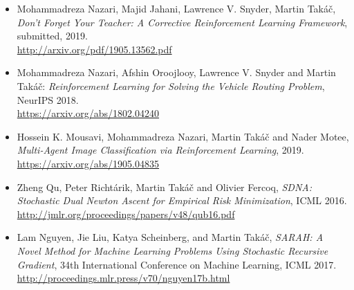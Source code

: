 \documentclass[11pt]{article}
\newcommand{\0}{ {\bf 0}}
\begin{document}
\begin{itemize}
\setlength\itemsep{0.1em}



\item 
Mohammadreza Nazari, Majid Jahani, Lawrence V. Snyder, Martin Tak\'a\v{c},
{\it Don't Forget Your Teacher: A Corrective Reinforcement Learning Framework}, submitted,
 2019. 
\\
\url{http://arxiv.org/pdf/1905.13562.pdf}

 
 

\item 
Mohammadreza Nazari, Afshin Oroojlooy, Lawrence V. Snyder and Martin Tak\'a\v{c}:
{\it Reinforcement Learning for Solving the Vehicle Routing Problem},
NeurIPS 2018.
\\
\url{https://arxiv.org/abs/1802.04240}





\item 
Hossein K. Mousavi, Mohammadreza Nazari, Martin Tak\'a\v{c} and Nader Motee,
{\it Multi-Agent Image Classification via Reinforcement Learning}, 2019. 
\\
\url{https://arxiv.org/abs/1905.04835}

 

 
 

 
 




\item Zheng Qu, Peter Richt\'arik, Martin Tak\'a\v{c}
and  Olivier Fercoq,
{\it SDNA: Stochastic Dual Newton Ascent for Empirical Risk Minimization},
    ICML 2016.
\\
\url{http://jmlr.org/proceedings/papers/v48/qub16.pdf}
 

 

 


\item
Lam Nguyen, Jie Liu, Katya Scheinberg, and Martin Tak\'a\v{c},
{\it
SARAH: A Novel Method for Machine Learning Problems Using Stochastic Recursive Gradient}, 34th International Conference on Machine Learning, ICML 2017.
\url{http://proceedings.mlr.press/v70/nguyen17b.html}

 








  

 
 
 

\end{itemize}
\end{document}
